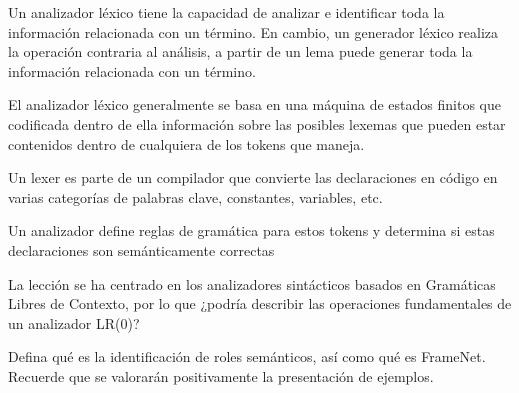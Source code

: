 \documentclass{exam}
\begin{document}
\begin{questions}
Un analizador léxico tiene la capacidad de analizar e identificar toda la información relacionada con un término. En cambio, un generador léxico realiza la operación contraria al análisis, a partir de un lema puede generar toda la información relacionada con un término.

El analizador léxico generalmente se basa en una máquina de estados finitos que codificada dentro de ella información sobre las posibles lexemas que pueden estar contenidos dentro de cualquiera de los tokens que maneja.

Un lexer es parte de un compilador que convierte las declaraciones en código en varias categorías de palabras clave, constantes, variables, etc.

Un analizador define reglas de gramática para estos tokens y determina si estas declaraciones son semánticamente correctas



\question La lección se ha centrado en los analizadores sintácticos basados en Gramáticas Libres de Contexto, por lo que ¿podría describir las operaciones fundamentales de un analizador LR(0)?

\question Defina qué es la identificación de roles semánticos, así como qué es FrameNet. Recuerde que se valorarán positivamente la presentación de ejemplos.

\end{questions}
\end{document}
